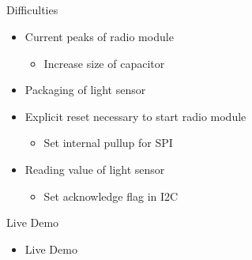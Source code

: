 	\subsection{}
	\begin{frame}{Difficulties}
		\begin{itemize}
			\item Current peaks of radio module
			\begin{itemize}
				\item Increase size of capacitor
			\end{itemize}
			\item Packaging of light sensor
			\item Explicit reset necessary to start radio module
			\begin{itemize}
				\item Set internal pullup for SPI
			\end{itemize}
			\item Reading value of light sensor
			\begin{itemize}
				\item Set acknowledge flag in I2C
			\end{itemize}
		\end{itemize}
	\end{frame}

	\begin{frame}{Live Demo}
		\begin{itemize}
			\item Live Demo
		\end{itemize}
	\end{frame}	
	

